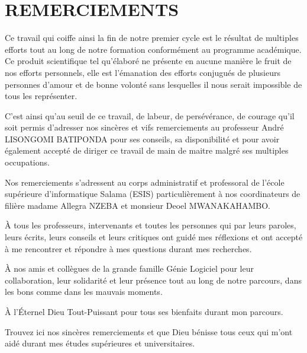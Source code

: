 \chapter*{REMERCIEMENTS}
    Ce travail qui coiffe ainsi la fin de notre premier cycle est le
    résultat de multiples efforts tout au long de notre formation conformément
    au programme académique. Ce produit scientifique tel qu’élaboré ne présente
    en aucune manière le fruit de nos efforts personnels, elle est l’émanation
    des efforts conjugués de plusieurs personnes d’amour et de bonne volonté
    sans lesquelles il nous serait impossible de tous les représenter.
    \par
    C’est ainsi qu’au seuil de ce travail, de labeur, de persévérance,
    de courage qu’il soit permis d’adresser nos sincères et vifs remerciements 
    au professeur André LISONGOMI BATIPONDA pour ses conseils, sa disponibilité et pour avoir également accepté
    de diriger ce travail de main de maitre malgré ses multiples occupations.
    \par
    Nos remerciements s’adressent au corps administratif et professoral de l’école supérieure d’informatique
    Salama (ESIS) particulièrement à nos coordinateurs de filière madame Allegra NZEBA et monsieur Deoel MWANAKAHAMBO. %
    \par
    À tous les professeurs, intervenants et toutes les
    personnes qui par leurs paroles, leurs écrits, leurs conseils et leurs critiques ont guidé mes réflexions
    et ont accepté à me rencontrer et répondre à mes questions durant mes recherches. 
    \par
    À nos amis et collègues de la grande famille Génie Logiciel
    pour leur collaboration, leur solidarité et leur présence tout au long de notre
    parcours, dans les bons comme dans les mauvais moments.
    \par
    À l’Éternel Dieu Tout-Puissant pour tous ses bienfaits durant mon parcours.
    \par
    Trouvez ici nos sincères remerciements et que Dieu bénisse tous ceux qui m’ont aidé durant mes études supérieures et
    universitaires.